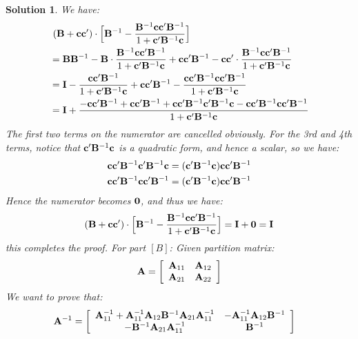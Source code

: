 \documentclass[11pt]{article}\usepackage[]{graphicx}\usepackage[]{color}
\newtheorem{sol}{Solution}
\begin{document}
\begin{sol}
	We have:
	\begin{align*}
		&\ ({\bf B}+ {\bf c}{\bf c}')\cdot \Big[{\bf B}^{-1} - \frac{{\bf B}^{-1}{\bf c}{\bf c}'{\bf B}^{-1}}{1 + {\bf c}'{\bf B}^{-1}{\bf c}}\Big]\\
		&= {\bf B}{\bf B}^{-1} - {\bf B}\cdot \frac{{\bf B}^{-1}{\bf c}{\bf c}'{\bf B}^{-1}}{1 + {\bf c}'{\bf B}^{-1}{\bf c}} + {\bf c}{\bf c}'{\bf B}^{-1} - {\bf c}{\bf c}'\cdot \frac{{\bf B}^{-1}{\bf c}{\bf c}'{\bf B}^{-1}}{1 + {\bf c}'{\bf B}^{-1}{\bf c}}\\
		&= {\bf I} - \frac{{\bf c}{\bf c}'{\bf B}^{-1}}{1 +{\bf c}'{\bf B}^{-1}{\bf c}} + {\bf c}{\bf c}'{\bf B}^{-1} - \frac{{\bf c}{\bf c}'{\bf B}^{-1}{\bf c}{\bf c}'{\bf B}^{-1}}{1 + {\bf c}'{\bf B}^{-1}{\bf c}}\\
		&= {\bf I} + \frac{-{\bf c}{\bf c}'{\bf B}^{-1} +{\bf c}{\bf c}'{\bf B}^{-1} + {\bf c}{\bf c}'{\bf B}^{-1}{\bf c}'{\bf B}^{-1}{\bf c} - {\bf c}{\bf c}'{\bf B}^{-1}{\bf c}{\bf c}'{\bf B}^{-1} }{1 + {\bf c}'{\bf B}^{-1}{\bf c}}
	\end{align*}
	The first two terms on the numerator are cancelled obviously. For the 3rd and 4th terms, notice that ${\bf c}'{\bf B}^{-1}{\bf c}$ is a quadratic form, and hence a scalar, so we have:
	\begin{align*}
		{\bf c}{\bf c}'{\bf B}^{-1}{\bf c}'{\bf B}^{-1}{\bf c}  &=({\bf c}'{\bf B}^{-1}{\bf c}){\bf c}{\bf c}'{\bf B}^{-1} \\
		{\bf c}{\bf c}'{\bf B}^{-1}{\bf c}{\bf c}'{\bf B}^{-1} &= ({\bf c}'{\bf B}^{-1}{\bf c}){\bf c}{\bf c}'{\bf B}^{-1}
	\end{align*}
	Hence the numerator becomes ${\bf 0}$, and thus we have:
	\begin{align*}
	({\bf B}+ {\bf c}{\bf c}')\cdot \Big[{\bf B}^{-1} - \frac{{\bf B}^{-1}{\bf c}{\bf c}'{\bf B}^{-1}}{1 + {\bf c}'{\bf B}^{-1}{\bf c}}\Big] = {\bf I} + {\bf 0} = {\bf I}
	\end{align*}
	this completes the proof.\vskip 2mm
	For part $[B]$:\vskip 2mm
	Given partition matrix:
	\begin{align*}
		{\bf A} = \left[\begin{array}{cc} {\bf A}_{11}& {\bf A}_{12}\\{\bf A}_{21} & {\bf A}_{22}
		\end{array}\right]
	\end{align*}
	We want to prove that:
	\begin{align*}
		{\bf A}^{-1} &= \left[\begin{array}{cc} {\bf A}_{11}^{-1} + {\bf A}_{11}^{-1}{\bf A}_{12}{\bf B}^{-1}{\bf A}_{21}{\bf A}_{11}^{-1}& -{\bf A}_{11}^{-1}{\bf A}_{12}{\bf B}^{-1}\\ -{\bf B}^{-1}{\bf A}_{21}{\bf A}_{11}^{-1}& {\bf B}^{-1}\end{array}\right]

\end{align*}
\end{sol}
\end{document}
